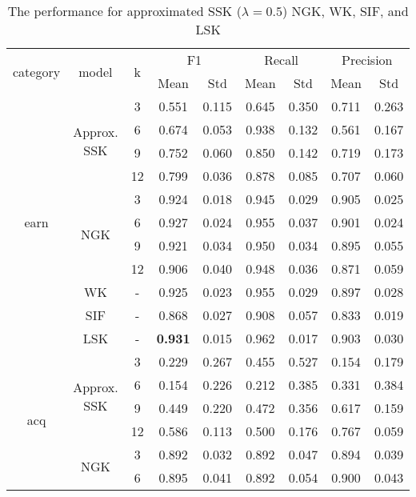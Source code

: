 \documentclass{article}
\begin{document}
\begin{table}[]
\centering
\caption{The performance for approximated SSK ($\lambda = 0.5$) NGK, WK, SIF, and LSK}
\label{lamdba_0.5_performance}
\begin{tabular}{|c|c|c|c|c|c|c|c|c|}
\hline
\multirow{2}{*}{category} & \multirow{2}{*}{model} & \multirow{2}{*}{k} & \multicolumn{2}{|c|}{F1} & \multicolumn{2}{|c|}{Recall} & \multicolumn{2}{|c|}{Precision} \\ \cline{4-9}
 & & & \multirow{1}{*}{Mean} & \multirow{1}{*}{Std} & \multirow{1}{*}{Mean} & \multirow{1}{*}{Std} & \multirow{1}{*}{Mean} & \multirow{1}{*}{Std}\\ \hline
\multirow{11}{*}{earn}
& \multirow{4}{*}{Approx. SSK}
   & 3 & 0.551 & 0.115 & 0.645 & 0.350 & 0.711  & 0.263 \\
 & & 6 & 0.674 & 0.053 & 0.938 & 0.132 & 0.561 & 0.167  \\
 & & 9 & 0.752 & 0.060 & 0.850 & 0.142 & 0.719 & 0.173  \\
 & & 12 & 0.799 & 0.036 & 0.878 & 0.085 & 0.707 & 0.060  \\
\cline{2-9}
& \multirow{4}{*}{NGK}
& 3 & 0.924 & 0.018 & 0.945 & 0.029 & 0.905 & 0.025 \\
& & 6 & 0.927 & 0.024 & 0.955 & 0.037 & 0.901 & 0.024 \\
& & 9 & 0.921 & 0.034 & 0.950 & 0.034 & 0.895 & 0.055 \\
& & 12 & 0.906 & 0.040 & 0.948 & 0.036 & 0.871 & 0.059 \\
 \cline{2-9}
 & \multirow{1}{*}{WK}  & - & 0.925 & 0.023 & 0.955 & 0.029 & 0.897 & 0.028 \\ \cline{2-9}
 & \multirow{1}{*}{SIF} & - & 0.868 & 0.027 & 0.908 & 0.057 & 0.833 & 0.019 \\ \cline{2-9}
 & \multirow{1}{*}{LSK} & - & \textbf{0.931} & 0.015 & 0.962 & 0.017 & 0.903 & 0.030 \\ \hline
\multirow{11}{*}{acq}
& \multirow{4}{*}{Approx. SSK}
   & 3 & 0.229 & 0.267 & 0.455 & 0.527 & 0.154 & 0.179  \\
 & & 6 & 0.154 & 0.226 & 0.212 & 0.385 & 0.331 & 0.384  \\
 & & 9 & 0.449 & 0.220 & 0.472 & 0.356 & 0.617 & 0.159  \\
 & & 12 & 0.586 & 0.113 & 0.500 & 0.176 & 0.767 & 0.059  \\ \cline{2-9}
& \multirow{4}{*}{NGK}
   & 3 & 0.892 & 0.032 & 0.892 & 0.047 & 0.894 & 0.039  \\
 & & 6 & 0.895 & 0.041 & 0.892 & 0.054 & 0.900 & 0.043  \\

\end{tabular}
\end{table}
\end{document}
